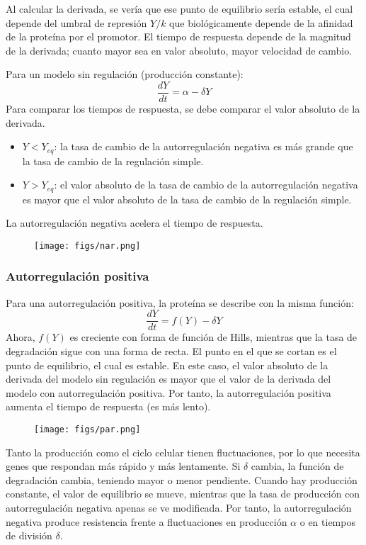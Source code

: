 Al calcular la derivada, se vería que ese punto de equilibrio sería estable, el cual depende del umbral de represión $Y/k$ que biológicamente depende de la afinidad de la proteína por el promotor. El tiempo de respuesta depende de la magnitud de la derivada; cuanto mayor sea en valor absoluto, mayor velocidad de cambio.

Para un modelo sin regulación (producción constante):
$$\frac{dY}{dt} = \alpha - \delta Y$$
Para comparar los tiempos de respuesta, se debe comparar el valor absoluto de la derivada.
\begin{itemize}
\item $Y < Y_{eq}$: la tasa de cambio de la autorregulación negativa es más grande que la tasa de cambio de la regulación simple.
\item $Y > Y_{eq}$: el valor absoluto de la tasa de cambio de la autorregulación negativa es mayor que el valor absoluto de la tasa de cambio de la regulación simple. 
\end{itemize}

La autorregulación negativa acelera el tiempo de respuesta.
\begin{figure}[h]
\centering
\texttt{[image: figs/nar.png]}
\end{figure}

\subsubsection{Autorregulación positiva}
Para una autorregulación positiva, la proteína se describe con la misma función:
$$\frac{dY}{dt} = f(Y) - \delta Y$$
Ahora, $f(Y)$ es creciente con forma de función de Hills, mientras que la tasa de degradación sigue con una forma de recta. El punto en el que se cortan es el punto de equilibrio, el cual es estable. En este caso, el valor absoluto de la derivada del modelo sin regulación es mayor que el valor de la derivada del modelo con autorregulación positiva. Por tanto, la autorregulación positiva aumenta el tiempo de respuesta (es más lento). 
\begin{figure}[h]
\centering
\texttt{[image: figs/par.png]}
\end{figure}

Tanto la producción como el ciclo celular tienen fluctuaciones, por lo que necesita genes que respondan más rápido y más lentamente. Si $\delta$ cambia, la función de degradación cambia, teniendo mayor o menor pendiente. Cuando hay producción constante, el valor de equilibrio se mueve, mientras que la tasa de producción con autorregulación negativa apenas se ve modificada. Por tanto, la autorregulación negativa produce resistencia frente a fluctuaciones en producción $\alpha$ o en tiempos de división $\delta$. 


